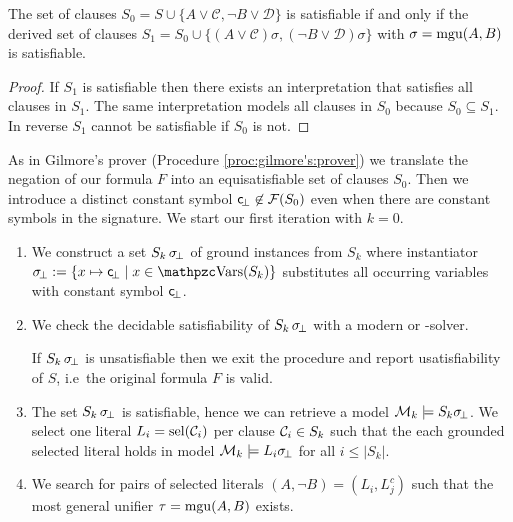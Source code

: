 \begin{lemma}
	The set of clauses
	$S_0 = S \cup
	\{
		 A\lor\mathcal C, \lnot B\lor\mathcal D
	\}$
	is satisfiable if and only if
	the derived set of clauses
	$S_1 = S_0 \cup \{ (A\lor\mathcal C)\sigma, (\lnot B\lor\mathcal D)\sigma\}$
	with $\sigma = \operatorname{mgu}(A,B)$ is satisfiable.
\end{lemma}

\begin{proof}
	If $S_1$ is satisfiable then there exists an interpretation that satisfies all clauses in $S_1$.
	The same interpretation models all clauses in $S_0$ because $S_0\subseteq S_1$.
	In reverse $S_1$ cannot be satisfiable if $S_0$ is not.


\end{proof}

\begin{procedure}\label{proc:inst:gen:loop}
	As in Gilmore's prover (Procedure \ref{proc:gilmore's:prover})
	we translate the negation of our formula $F$ into an equisatisfiable set of clauses
	$S_0$. Then we introduce a distinct constant symbol
	$\mathsf{c}\!_\bot\not\in\mathcal{F}(S_0)$ even when there are constant symbols in the signature.
	We start our first iteration with $k=0$.

	\begin{enumerate}
		\item\label{step:igl:skbot}
		We construct a set $S_{k}\,\sigma\!_\bot$ of ground instances from $S_k$
		where instantiator $\subsbot := \{ x\mapsto \consbot \mid x\in\var(S_k) \} $
		substitutes all occurring variables with constant symbol $\mathsf{c}\!_\bot$.
%
		\item\label{step:igl:sksat} We check the decidable satisfiability of $S_k\,\sigma\!_\bot$
		with a modern \SAT or \SMT-solver.

		If $S_k\,\sigma\!_\bot$ is unsatisfiable then we exit the procedure and report {\myem usatisfiability} of $S$, i.e~the original formula $F$ is valid.

		\item\label{step:igl:model} The set $S_k\,\sigma\!_\bot$ is satisfiable, hence we can retrieve a model $\mathcal{M}_k \models S_k\sigma\!_\bot$.
		We select one literal $L_i = \operatorname{sel}(\mathcal{C}_i)$ per clause $\mathcal{C}_i \in S_k$
		such that the each grounded selected literal holds in model
		$\mathcal{M}_k\models L_i\sigma\!_\bot$ for all $i\leq | S_k |$.

		\item\label{step:igl:clashes} We search for pairs of selected literals $(A, \lnot B) = (L_i, L_j^c)$
		such that the most general unifier $\tau = \operatorname{mgu}(A,B)$ exists.


\end{enumerate}
\end{procedure}
